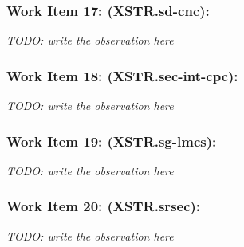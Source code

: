 \subsubsection{Work Item 17: (XSTR.sd-cnc):}

\textit{TODO: write the observation here}

\subsubsection{Work Item 18: (XSTR.sec-int-cpc):}

\textit{TODO: write the observation here}

\subsubsection{Work Item 19: (XSTR.sg-lmcs):}

\textit{TODO: write the observation here}

\subsubsection{Work Item 20: (XSTR.srsec):}

\textit{TODO: write the observation here}
